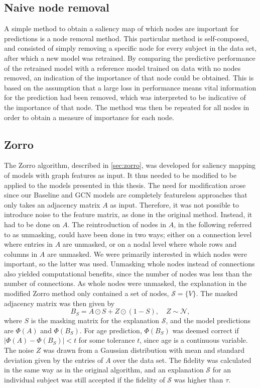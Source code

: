 \subsection{Naive node removal}
A simple method to obtain a saliency map of which nodes are important for predictions is a node removal method. This particular method is self-composed, and consisted of simply removing a specific node for every subject in the data set, after which a new model was retrained. By comparing the predictive performance of the retrained model with a reference model trained on data with no nodes removed, an indication of the importance of that node could be obtained. This is based on the assumption that a large loss in performance means vital information for the prediction had been removed, which was interpreted to be indicative of the importance of that node. The method was then be repeated for all nodes in order to obtain a measure of importance for each node.


\subsection{Zorro}

The Zorro algorithm, described in \cref{sec:zorro}, was developed for saliency mapping of models with graph features as input. It thus needed to be modified to be applied to the models presented in this thesis. The need for modification arose since our Baseline and GCN models are completely featureless approaches that only takes an adjacency matrix $A$ as input. Therefore, it was not possible to introduce noise to the feature matrix, as done in the original method. Instead, it had to be done on $A$. The reintroduction of nodes in $A$, in the following referred to as unmasking, could have been done in two ways; either on a connection level where entries in $A$ are unmasked, or on a nodal level where whole rows and columns in $A$ are unmasked. We were primarily interested in which nodes were important, so the latter was used. Unmasking whole nodes instead of connections also yielded computational benefits, since the number of nodes was less than the number of connections. As whole nodes were unmasked, the explanation in the modified Zorro method only contained a set of nodes, $\mathcal{S} = \{V\}$. The masked adjacency matrix was then given by 
\begin{equation*}
    B_S = A \odot S + Z \odot (1- S), \quad Z \sim \mathcal{N},
\end{equation*}
where $S$ is the masking matrix for the explanation $\mathcal{S}$, and the model predictions are $\Phi(A)$ and $\Phi(B_S)$. For age prediction, $\Phi(B_S)$ was deemed correct if $\left|\Phi(A) - \Phi(B_S)\right| < t$ for some tolerance $t$, since age is a continuous variable. The noise $Z$ was drawn from a Gaussian distribution with mean and standard deviation given by the entries of $A$ over the data set. The fidelity was calculated in the same way as in the original algorithm, and an explanation $\mathcal{S}$ for an individual subject was still accepted if the fidelity of $\mathcal{S}$ was higher than $\tau$. 

